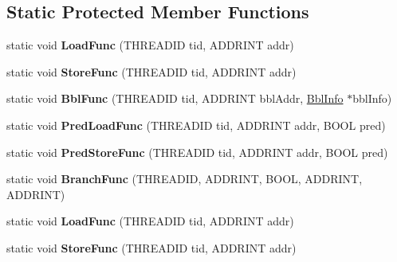 \subsection*{Static Protected Member Functions}
\begin{DoxyCompactItemize}
\item 
\hypertarget{classNullCore_a9ab27a5bee6a8ea42d21b61b261e5ba6}{static void {\bfseries Load\-Func} (T\-H\-R\-E\-A\-D\-I\-D tid, A\-D\-D\-R\-I\-N\-T addr)}\label{classNullCore_a9ab27a5bee6a8ea42d21b61b261e5ba6}

\item 
\hypertarget{classNullCore_a691fe50021d9c1bf60a082a6ed3f8275}{static void {\bfseries Store\-Func} (T\-H\-R\-E\-A\-D\-I\-D tid, A\-D\-D\-R\-I\-N\-T addr)}\label{classNullCore_a691fe50021d9c1bf60a082a6ed3f8275}

\item 
\hypertarget{classNullCore_ab39db2af3c311625b3fc90d91c1e4a9c}{static void {\bfseries Bbl\-Func} (T\-H\-R\-E\-A\-D\-I\-D tid, A\-D\-D\-R\-I\-N\-T bbl\-Addr, \hyperlink{structBblInfo}{Bbl\-Info} $\ast$bbl\-Info)}\label{classNullCore_ab39db2af3c311625b3fc90d91c1e4a9c}

\item 
\hypertarget{classNullCore_a68c4e6099ba2842d2b65bd0df5b8440e}{static void {\bfseries Pred\-Load\-Func} (T\-H\-R\-E\-A\-D\-I\-D tid, A\-D\-D\-R\-I\-N\-T addr, B\-O\-O\-L pred)}\label{classNullCore_a68c4e6099ba2842d2b65bd0df5b8440e}

\item 
\hypertarget{classNullCore_ab5a9f6914b66ee69d8576a8a76e2aad1}{static void {\bfseries Pred\-Store\-Func} (T\-H\-R\-E\-A\-D\-I\-D tid, A\-D\-D\-R\-I\-N\-T addr, B\-O\-O\-L pred)}\label{classNullCore_ab5a9f6914b66ee69d8576a8a76e2aad1}

\item 
\hypertarget{classNullCore_ab2805cc932388c43a83d55556742b829}{static void {\bfseries Branch\-Func} (T\-H\-R\-E\-A\-D\-I\-D, A\-D\-D\-R\-I\-N\-T, B\-O\-O\-L, A\-D\-D\-R\-I\-N\-T, A\-D\-D\-R\-I\-N\-T)}\label{classNullCore_ab2805cc932388c43a83d55556742b829}

\item 
\hypertarget{classNullCore_ae98e0c3c917e9ce3281c86b4acbe094c}{static void {\bfseries Load\-Func} (T\-H\-R\-E\-A\-D\-I\-D tid, A\-D\-D\-R\-I\-N\-T addr)}\label{classNullCore_ae98e0c3c917e9ce3281c86b4acbe094c}

\item 
\hypertarget{classNullCore_acbf14f0fd12bab593a954e7c675cbb91}{static void {\bfseries Store\-Func} (T\-H\-R\-E\-A\-D\-I\-D tid, A\-D\-D\-R\-I\-N\-T addr)}\label{classNullCore_acbf14f0fd12bab593a954e7c675cbb91}


\end{DoxyCompactItemize}

